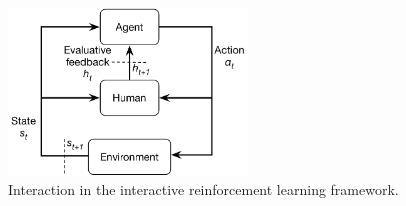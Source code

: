 {\begin{figure} [htb]
\centering
\includegraphics[width=2.5in]{humanrl.pdf}
\caption{Interaction in the interactive reinforcement learning framework.}
\label{humanrl}
\end{figure}
}

